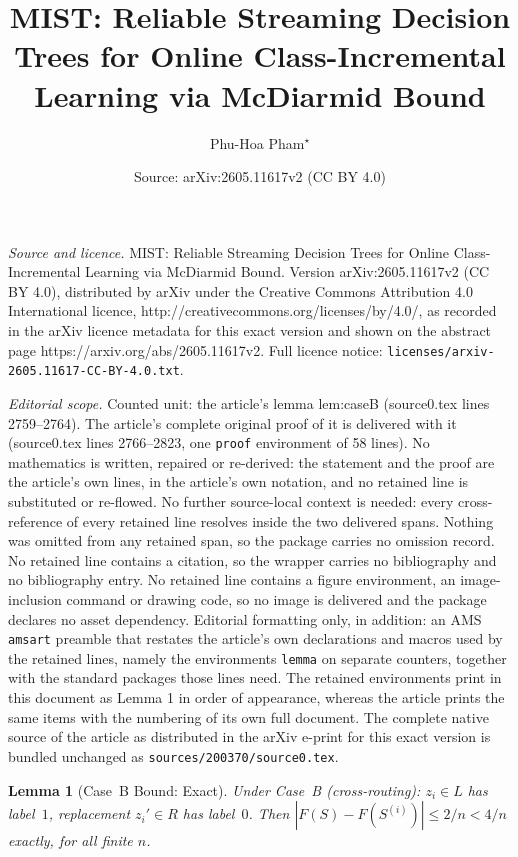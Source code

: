 \documentclass[10pt,a4paper]{amsart}
\title{MIST: Reliable Streaming Decision Trees for Online Class-Incremental Learning via McDiarmid Bound}
\author{Phu-Hoa Pham$^{\star}$}
\date{Source: arXiv:2605.11617v2 (CC BY 4.0)}
\newtheorem{lemma}{Lemma}
\begin{document}
\maketitle

\noindent\emph{Source and licence.} MIST: Reliable Streaming Decision Trees for Online Class-Incremental Learning via McDiarmid Bound. Version arXiv:2605.11617v2 (CC BY 4.0), distributed by arXiv under the Creative Commons Attribution 4.0 International licence, http://creativecommons.org/licenses/by/4.0/, as recorded in the arXiv licence metadata for this exact version and shown on the abstract page https://arxiv.org/abs/2605.11617v2. Full licence notice: \texttt{licenses/arxiv-2605.11617-CC-BY-4.0.txt}.\par\smallskip

\noindent\textit{Editorial scope.} Counted unit: the article's lemma lem:caseB (source0.tex lines 2759--2764). The article's complete original proof of it is delivered with it (source0.tex lines 2766--2823, one \texttt{proof} environment of 58 lines). No mathematics is written, repaired or re-derived: the statement and the proof are the article's own lines, in the article's own notation, and no retained line is substituted or re-flowed.  No further source-local context is needed: every cross-reference of every retained line resolves inside the two delivered spans.  Nothing was omitted from any retained span, so the package carries no omission record.  No retained line contains a citation, so the wrapper carries no bibliography and no bibliography entry.  No retained line contains a figure environment, an image-inclusion command or drawing code, so no image is delivered and the package declares no asset dependency.  Editorial formatting only, in addition: an AMS \texttt{amsart} preamble that restates the article's own declarations and macros used by the retained lines, namely the environments \texttt{lemma} on separate counters, together with the standard packages those lines need.  The retained environments print in this document as Lemma 1 in order of appearance, whereas the article prints the same items with the numbering of its own full document.  The complete native source of the article as distributed in the arXiv e-print for this exact version is bundled unchanged as \texttt{sources/200370/source0.tex}.
\begin{lemma}[Case~B Bound: Exact]
\label{lem:caseB}
Under Case~B (cross-routing): $z_i \in L$ has label~$1$,
replacement $z_i' \in R$ has label~$0$.
Then $|F(S) - F(S^{(i)})| \leq 2/n < 4/n$ exactly, for all finite $n$.
\end{lemma}
\end{document}
